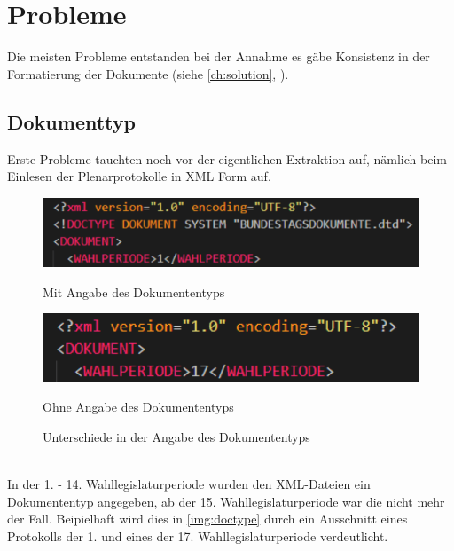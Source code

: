 \chapter{Probleme}
Die meisten Probleme entstanden bei der Annahme es gäbe Konsistenz in der Formatierung der Dokumente (siehe \autoref{ch:solution}, ). 
\section{Dokumenttyp}
Erste Probleme tauchten noch vor der eigentlichen Extraktion auf, nämlich beim Einlesen der Plenarprotokolle in XML Form auf.
\begin{figure}[h]
	\begin{minipage}{.48\linewidth}
		\includegraphics[width=\linewidth]{img/withdoctype.pdf}
		\caption*{Mit Angabe des Dokumententyps}
	\end{minipage}\hfill
	\begin{minipage}{.48\linewidth}
		\includegraphics[width=\linewidth]{img/withoutdoctype.pdf}
		\caption*{Ohne Angabe des Dokumententyps}
	\end{minipage}
	\caption{Unterschiede in der Angabe des Dokumententyps}
	\label{img:doctype}
\end{figure}\\
In der 1. - 14. Wahllegislaturperiode wurden den XML-Dateien ein Dokumententyp angegeben, ab der 15. Wahllegislaturperiode war die nicht mehr der Fall. Beipielhaft wird dies in \autoref{img:doctype} durch ein Ausschnitt eines Protokolls der 1. und eines der 17. Wahllegislaturperiode verdeutlicht.

